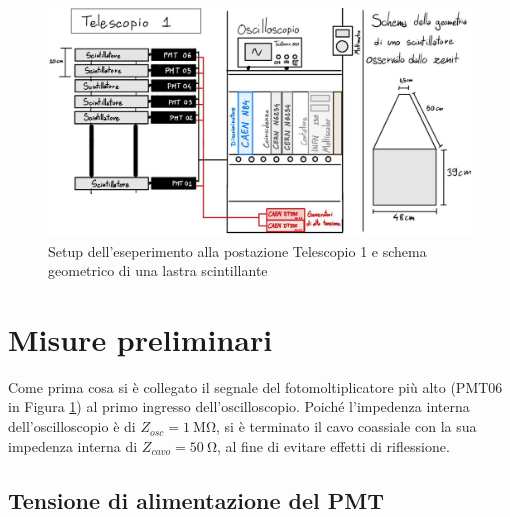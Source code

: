\documentclass[10pt,a4paper]{article}
\begin{document}
\begin{figure}[h]
    \centering
    \includegraphics[width=\columnwidth]{img/setup+.jpeg}
    \caption{Setup dell'eseperimento alla postazione Telescopio 1 e schema geometrico di una lastra scintillante}
    \label{fig:setup}
\end{figure}


\section{Misure preliminari}

Come prima cosa si è collegato il segnale del fotomoltiplicatore più alto (PMT06 in Figura \ref{fig:setup}) al primo ingresso dell'oscilloscopio. Poiché l'impedenza interna dell'oscilloscopio è di $Z_{osc}=\SI{1}{\mega \ohm}$, si è terminato il cavo coassiale con la sua impedenza interna di $Z_{cavo}=\SI{50}{\ohm}$, al fine di evitare effetti di riflessione.

\subsection{Tensione di alimentazione del PMT}
\end{document}
